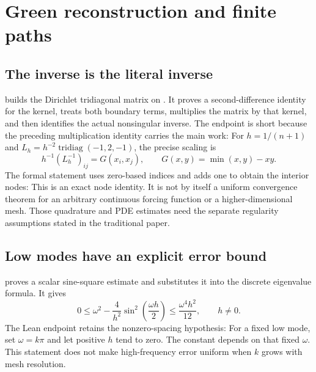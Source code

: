 \clearpage\section{Green reconstruction and finite paths}
\label{sec:green}
\subsection{The inverse is the literal inverse}
 builds the Dirichlet tridiagonal matrix on . It proves a second-difference identity for the kernel, treats both boundary terms, multiplies the matrix by that kernel, and then identifies the actual nonsingular inverse. The endpoint is short because the preceding multiplication identity carries the main work:
For $h=1/(n+1)$ and $L_h=h^{-2}\operatorname{tridiag}(-1,2,-1)$, the precise scaling is
\[
h^{-1}(L_h^{-1})_{ij}=G(x_i,x_j),\qquad G(x,y)=\min(x,y)-xy.
\]
The formal statement uses zero-based  indices and adds one to obtain the interior nodes:
This is an exact node identity. It is not by itself a uniform convergence theorem for an arbitrary continuous forcing function or a higher-dimensional mesh. Those quadrature and PDE estimates need the separate regularity assumptions stated in the traditional paper.

\subsection{Low modes have an explicit error bound}
 proves a scalar sine-square estimate and substitutes it into the discrete eigenvalue formula. It gives
\[
0\le \omega^2-\frac{4}{h^2}\sin^2\!\left(\frac{\omega h}{2}\right)
\le\frac{\omega^4h^2}{12},\qquad h\ne0.
\]
The Lean endpoint retains the nonzero-spacing hypothesis:
For a fixed low mode, set $\omega=k\pi$ and let positive $h$ tend to zero. The constant depends on that fixed $\omega$. This statement does not make high-frequency error uniform when $k$ grows with mesh resolution.

